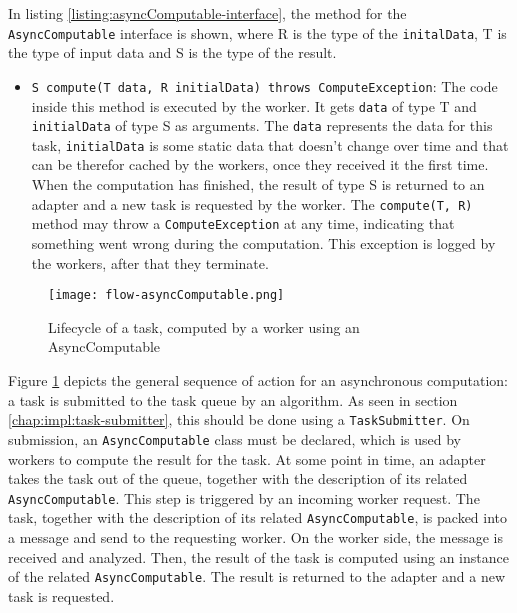   In listing \ref{listing:asyncComputable-interface}, the method for the \texttt{AsyncComputable} interface is shown, where R is the type of the \texttt{initalData}, T is the type of input data and S is the type of the result.
  
  
  
  \begin{itemize}
    \item \texttt{S compute(T data, R initialData) throws ComputeException}: The code inside this method is executed by the worker. It gets \texttt{data} of type T and \texttt{initialData} of type S as arguments. The \texttt{data} represents the data for this task, \texttt{initialData} is some static data that doesn't change over time and that can be therefor cached by the workers, once they received it the first time. When the computation has finished, the result of type S is returned to an adapter and a new task is requested by the worker. The \texttt{compute(T, R)} method may throw a \texttt{ComputeException} at any time, indicating that something went wrong during the computation. This exception is logged by the workers, after that they terminate.
  \end{itemize}
  
  \begin{figure}[ht!]
    \centering
    \texttt{[image: flow-asyncComputable.png]}
    \caption{Lifecycle of a task, computed by a worker using an AsyncComputable}
    \label{fig:async-computable}
  \end{figure}
  
  Figure \ref{fig:async-computable} depicts the general sequence of action for an asynchronous computation: a task is submitted to the task queue by an algorithm. As seen in section \ref{chap:impl:task-submitter}, this should be done using a \texttt{TaskSubmitter}. On submission, an \texttt{AsyncComputable} class must be declared, which is used by workers to compute the result for the task. At some point in time, an adapter takes the task out of the queue, together with the description of its related \texttt{AsyncComputable}. This step is triggered by an incoming worker request. The task, together with the description of its related \texttt{AsyncComputable}, is packed into a message and send to the requesting worker. On the worker side, the message is received and analyzed. Then, the result of the task is computed using an instance of the related \texttt{AsyncComputable}. The result is returned to the adapter and a new task is requested.
  
